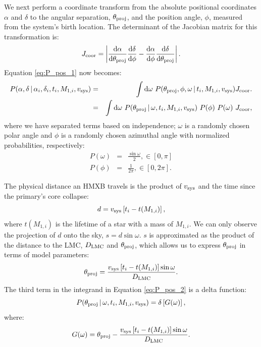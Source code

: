 \documentclass[12pt, preprint]{aastex}
\newcommand{\given}{\,|\,}
\newcommand{\dd}{\mathrm{d}}
\begin{document}
We next perform a coordinate transform from the absolute positional coordinates $\alpha$ and $\delta$ to the angular separation, $\theta_{\rm proj}$, and the position angle, $\phi$, measured from the system's birth location. The determinant of the Jacobian matrix for this transformation is:
\begin{equation}
J_{\rm coor} = \left| \frac{\dd \alpha}{\dd \theta_{\rm proj}} \frac{\dd \delta}{\dd \phi} - \frac{\dd \alpha}{\dd \phi} \frac{\dd \delta}{\dd \theta_{\rm proj}} \right|.
\end{equation}
Equation \ref{eq:P_pos_1} now becomes:
\begin{eqnarray}
P(\alpha, \delta \given \alpha_i, \delta_i, t_i, M_{1,i}, v_{\rm sys} ) &=& \int \dd \omega\ P(\theta_{\rm proj}, \phi, \omega \given t_i, M_{1,i}, v_{\rm sys} ) J_{\rm coor}. \nonumber \\
&=& \int \dd \omega\ P(\theta_{\rm proj} \given \omega,  t_i, M_{1,i}, v_{\rm sys} )\ P(\phi)\ P(\omega)\ J_{\rm coor}, \label{eq:P_pos_2}
\end{eqnarray}
where we have separated terms based on independence; $\omega$ is a randomly chosen polar angle and $\phi$ is a randomly chosen azimuthal angle with normalized probabilities, respectively: 
\begin{eqnarray}
P(\omega) &=& \frac{\sin \omega} {2}, \in [0,\pi] \\
P(\phi) &=& \frac{1}{2 \pi}, \in [0, 2\pi].
\end{eqnarray}


The physical distance an HMXB travels is the product of $v_{\rm sys}$ and the time since the primary's core collapse:
\begin{equation}
d = v_{\rm sys} \left[t_i - t(M_{1,i}) \right],
\end{equation}
where $t(M_{1,i})$ is the lifetime of a star with a mass of $M_{1,i}$. We can only observe the projection of $d$ onto the sky, $s = d \sin \omega$. $s$ is approximated as the product of the distance to the LMC, $D_{\rm LMC}$ and $\theta_{\rm proj}$, which allows us to express $\theta_{\rm proj}$ in terms of model parameters:
\begin{equation}
\theta_{\rm proj} = \frac{v_{\rm sys} \left[ t_i - t(M_{1,i}) \right] \sin \omega}{D_{\rm LMC}}. \label{eq:theta_proj}
\end{equation}
The third term in the integrand in Equation \ref{eq:P_pos_2} is a delta function:
\begin{equation}
P(\theta_{\rm proj} \given \omega, t_i, M_{1,i}, v_{\rm sys}) = \delta \left[G(\omega)\right], \label{eq:P_theta_proj}
\end{equation}
where:
\begin{equation}
G(\omega) = \theta_{\rm proj} - \frac{v_{\rm sys} \left[t_i - t(M_{1,i}) \right] \sin \omega}{D_{\rm LMC}}.\end{equation}
\end{document}
